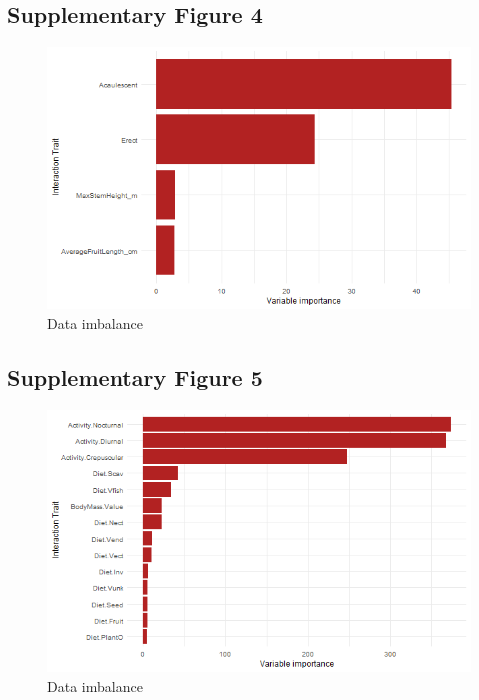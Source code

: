 \documentclass[
]{agujournal2019}
\begin{document}
\subsection{Supplementary Figure 4}

\begin{figure}[H]

{\centering \includegraphics[width=5.67708in,height=\textheight,keepaspectratio]{sup_figures/palm_var_imp.jpg}

}

\caption{Data imbalance}

\end{figure}%

\subsection{Supplementary Figure 5}

\begin{figure}[H]

{\centering \includegraphics[width=5.67708in,height=\textheight,keepaspectratio]{sup_figures/mammal_var_imp.jpg}

}

\caption{Data imbalance}

\end{figure}%
\end{document}
